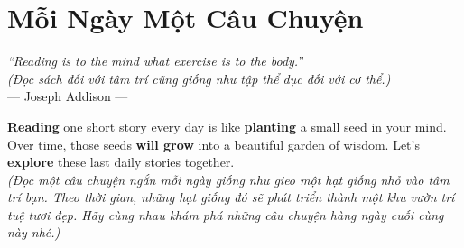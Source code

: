 \chapter{Mỗi Ngày Một Câu Chuyện}

\begin{center}
  \textit{\color{truyenblue}``Reading is to the mind what exercise is to the body.''}\\
  \textit{(Đọc sách đối với tâm trí cũng giống như tập thể dục đối với cơ thể.)}\\[4pt]
  \small\color{truyengold}--- Joseph Addison ---
\end{center}

\ngancach

\begin{tcolorbox}[
  colback=truyenred!5, colframe=truyenred!40, arc=6pt,
  title={\bfseries Quà tặng cuộc sống (Gifts of Life)},
  fonttitle=\bfseries\color{truyenred}
]
  \textbf{Reading} one short story every day is like \textbf{planting} a small seed in your mind. Over time, those seeds \textbf{will grow} into a beautiful garden of wisdom. Let's \textbf{explore} these last daily stories together.
  \\ \textit{(Đọc một câu chuyện ngắn mỗi ngày giống như gieo một hạt giống nhỏ vào tâm trí bạn. Theo thời gian, những hạt giống đó sẽ phát triển thành một khu vườn trí tuệ tươi đẹp. Hãy cùng nhau khám phá những câu chuyện hàng ngày cuối cùng này nhé.)}
\end{tcolorbox}

\vspace{0.6cm}


\ngayDay{}

